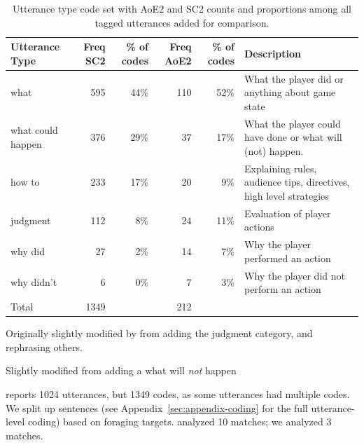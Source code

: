 \begin{table}[ht!]
  \begin{threeparttable}
    \caption{Utterance type code set with AoE2 and SC2 counts\cite{dodge2018} and proportions among all tagged utterances added for comparison. }
    \begin{tabularx}{\textwidth}{@{}l|rr|rr|X@{}}
      \toprule
      \textbf{Utterance Type \tnote{a}} & \textbf{Freq SC2} & \textbf{\% of codes} & \textbf{Freq AoE2} & \textbf{\% of codes} & \textbf{Description}                                  \\ \midrule
      what                    & 595               & 44\%           & 110                & 52\%          & What the player did or anything about game state                   \\
      what could happen       & 376               & 29\%           & 37                 & 17\%          & What the player could have done or what will (not\tnote{b}) happen.\\
      how to                  & 233               & 17\%           & 20                 & 9\%          & Explaining rules, audience tips, directives, high level strategies \\
      judgment      & 112               & 8\%            & 24                 & 11\%          & Evaluation of player actions                                       \\
      why did                    & 27                & 2\%            & 14                  & 7\%           & Why the player performed an action                                 \\
      why didn't              & 6                 & 0\%            & 7                 & 3\%           & Why the player did not perform an action                           \\ \midrule
      Total\tnote{c}          & 1349              &               & 212                 &               &
    \end{tabularx}
    \label{tab:lim-coding-compare}
    \begin{tablenotes}
      \footnotesize
    \item[a] Originally slightly modified by \citet{dodge2018} from \citet{lim2009} adding the judgment category, and rephrasing others.
    \item[b] Slightly modified from \citet{dodge2018} adding a what will \textit{not} happen
    \item[c] \citet{dodge2018} reports 1024 utterances, but 1349 codes, as some utterances had multiple codes. We split up sentences (see Appendix~\ref{sec:appendix-coding} for the full utterance-level coding) based on foraging targets. \citet{dodge2018} analyzed 10 matches; we analyzed 3 matches.
    \end{tablenotes}
  \end{threeparttable}
\end{table}

